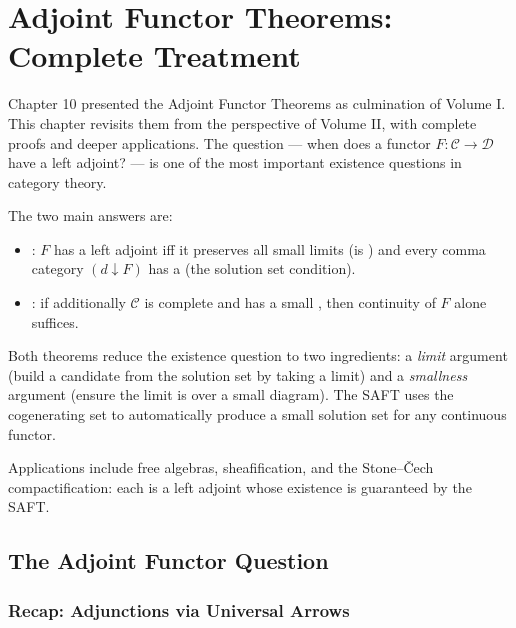 
\chapter{Adjoint Functor Theorems: Complete Treatment}

\begin{overviewbox}
Chapter 10 presented the Adjoint Functor Theorems as culmination of
Volume I. This chapter revisits them from the perspective of Volume II,
with complete proofs and deeper applications. The question --- when does
a functor $F : \mathcal{C} \to \mathcal{D}$ have a left adjoint? --- is
one of the most important existence questions in category theory.

The two main answers are:
\begin{itemize}
  \item {}: $F$ has a left
        adjoint iff it preserves all small limits (is )
        and every comma category $(d \downarrow F)$ has a
         (the solution set condition).
  \item {}: if additionally
        $\mathcal{C}$ is complete and has a small ,
        then continuity of $F$ alone suffices.
\end{itemize}
Both theorems reduce the existence question to two ingredients: a
\emph{limit} argument (build a candidate from the solution set by taking
a limit) and a \emph{smallness} argument (ensure the limit is over a small
diagram). The SAFT uses the cogenerating set to automatically produce a
small solution set for any continuous functor.

Applications include free algebras, sheafification, and the
Stone--\v{C}ech compactification: each is a left adjoint whose existence
is guaranteed by the SAFT.
\end{overviewbox}


\section{The Adjoint Functor Question}
\label{sec:aft-question-II}

\subsection{Recap: Adjunctions via Universal Arrows}

